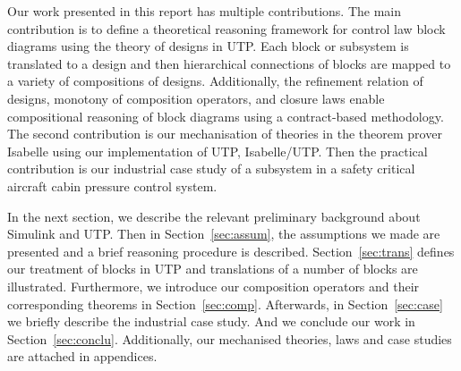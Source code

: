Our work presented in this report has multiple contributions. The main contribution is to define a theoretical reasoning framework for control law block diagrams using the theory of designs in UTP. Each block or subsystem is translated to a design and then hierarchical connections of blocks are mapped to a variety of compositions of designs. Additionally, the refinement relation of designs, monotony of composition operators, and closure laws enable compositional reasoning of block diagrams using a contract-based methodology. The second contribution is our mechanisation of theories in the theorem prover Isabelle using our implementation of UTP, Isabelle/UTP. Then the practical contribution is our industrial case study of a subsystem in a safety critical aircraft cabin pressure control system.

In the next section, we describe the relevant preliminary background about Simulink and UTP. Then in Section~\ref{sec:assum}, the assumptions we made are presented and a brief reasoning procedure is described. Section~\ref{sec:trans} defines our treatment of blocks in UTP and translations of a number of blocks are illustrated. Furthermore, we introduce our composition operators and their corresponding theorems in Section~\ref{sec:comp}. Afterwards, in Section~\ref{sec:case} we briefly describe the industrial case study. And we conclude our work in Section~\ref{sec:conclu}. Additionally, our mechanised theories, laws and case studies are attached in appendices.
